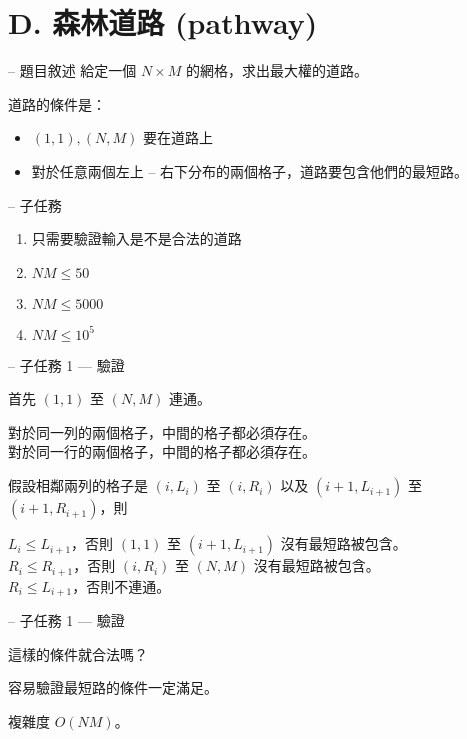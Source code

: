 \documentclass[hyperref,UTF8,notheorems,xcolor={dvipsnames}]{beamer}
\newcommand{\btitle}[1]{{\secname} -- #1}
\theoremstyle{definition}
\begin{document}
\section{D. 森林道路 (pathway)}

\begin{frame}[fragile]{\btitle{題目敘述}}
	給定一個 $N \times M$ 的網格，求出最大權的道路。  

	道路的條件是：
	\begin{itemize}
		\item $(1, 1), (N, M)$ 要在道路上
		\item 對於任意兩個左上 -- 右下分布的兩個格子，道路要包含他們的最短路。
	\end{itemize}
\end{frame}

\begin{frame}[fragile]{\btitle{子任務}}
	\begin{enumerate}
		\item 只需要驗證輸入是不是合法的道路
		\item $NM \leq 50$
		\item $NM \leq 5000$
		\item $NM \leq 10^5$
	\end{enumerate}
\end{frame}

\begin{frame}[fragile]{\btitle{子任務 1 --- 驗證}}
	
	首先 $(1, 1)$ 至 $(N, M)$ 連通。  

	{
		對於同一列的兩個格子，中間的格子都必須存在。\\  
		對於同一行的兩個格子，中間的格子都必須存在。  
	}

	{
		假設相鄰兩列的格子是 $(i, L_i)$ 至 $(i, R_i)$ 以及 $(i+1, L_{i+1})$ 至 $(i+1, R_{i+1})$，則  

		$L_i \leq L_{i+1}$，否則 $(1, 1)$ 至 $(i+1, L_{i+1})$ 沒有最短路被包含。\\
		$R_i \leq R_{i+1}$，否則 $(i, R_i)$ 至 $(N, M)$ 沒有最短路被包含。\\
		$R_i \leq L_{i+1}$，否則不連通。
	}

\end{frame}

\begin{frame}[fragile]{\btitle{子任務 1 --- 驗證}}
	
	這樣的條件就合法嗎？  

	容易驗證最短路的條件一定滿足。  

	複雜度 $O(NM)$。  

\end{frame}
\end{document}

